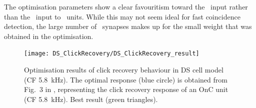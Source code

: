 The optimisation parameters show a clear favouritism toward the \LSR~input rather than the \HSR~input to \DS~units.
While this may not seem ideal for fast coincidence detection, the large number of \HSR~synapses makes up for the small weight that was obtained in the optimisation.

\begin{figure}[htb]
\centering
\texttt{[image: DS\_ClickRecovery/DS\_ClickRecovery\_result]}
\caption[Click recovery optimisation results in DS cell model]{%
Optimisation results of click recovery behaviour in DS cell model (CF 5.8~kHz).
The optimal response (blue circle) is obtained from Fig.~3 in \citet{BackoffPalombiEtAl:1997}, representing the click recovery response of an OnC unit (CF 5.8~kHz).
Best result (green triangles).   } \label{fig:DS_ClickRecovery_result}
\end{figure}









